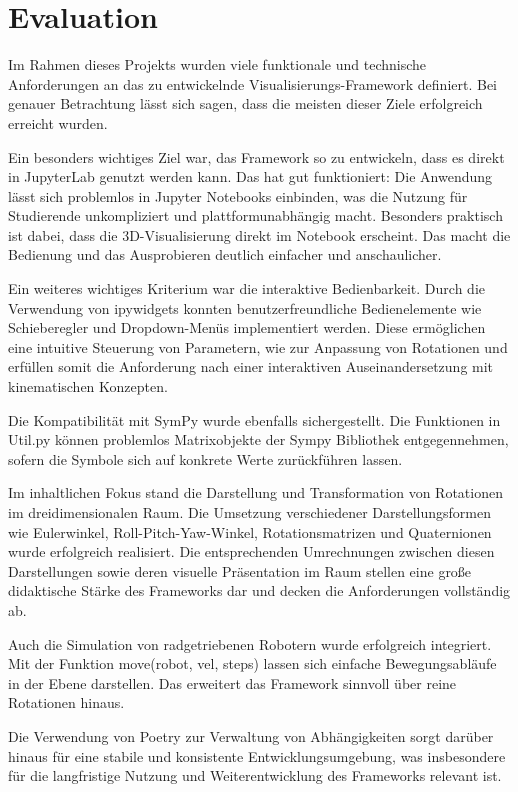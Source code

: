 \section{Evaluation}
Im Rahmen dieses Projekts wurden viele funktionale und technische Anforderungen an das zu entwickelnde Visualisierungs-Framework definiert.
Bei genauer Betrachtung lässt sich sagen, dass die meisten dieser Ziele erfolgreich erreicht wurden.

Ein besonders wichtiges Ziel war, das Framework so zu entwickeln,
dass es direkt in JupyterLab genutzt werden kann. Das hat gut funktioniert:
Die Anwendung lässt sich problemlos in Jupyter Notebooks einbinden, was die Nutzung für Studierende unkompliziert und plattformunabhängig macht.
Besonders praktisch ist dabei, dass die 3D-Visualisierung direkt im Notebook erscheint. Das macht die Bedienung und das Ausprobieren deutlich einfacher und anschaulicher.

Ein weiteres wichtiges Kriterium war die interaktive Bedienbarkeit.
Durch die Verwendung von ipywidgets konnten benutzerfreundliche Bedienelemente wie Schieberegler und Dropdown-Menüs implementiert werden.
Diese ermöglichen eine intuitive Steuerung von Parametern, wie zur Anpassung von Rotationen und erfüllen somit die
Anforderung nach einer interaktiven Auseinandersetzung mit kinematischen Konzepten.

Die Kompatibilität mit SymPy wurde ebenfalls sichergestellt. Die Funktionen in Util.py können problemlos Matrixobjekte der Sympy Bibliothek entgegennehmen,
sofern die Symbole sich auf konkrete Werte zurückführen lassen.

Im inhaltlichen Fokus stand die Darstellung und Transformation von Rotationen im dreidimensionalen Raum.
Die Umsetzung verschiedener Darstellungsformen wie Eulerwinkel, Roll-Pitch-Yaw-Winkel, Rotationsmatrizen und Quaternionen wurde erfolgreich realisiert.
Die entsprechenden Umrechnungen zwischen diesen Darstellungen sowie deren visuelle Präsentation im Raum stellen eine große didaktische Stärke des Frameworks dar und decken die Anforderungen vollständig ab.

Auch die Simulation von radgetriebenen Robotern wurde erfolgreich integriert. Mit der Funktion move(robot, vel, steps)
lassen sich einfache Bewegungsabläufe in der Ebene darstellen. Das erweitert das Framework sinnvoll über reine Rotationen hinaus.

Die Verwendung von Poetry zur Verwaltung von Abhängigkeiten sorgt darüber hinaus für eine stabile und konsistente Entwicklungsumgebung,
was insbesondere für die langfristige Nutzung und Weiterentwicklung des Frameworks relevant ist.

